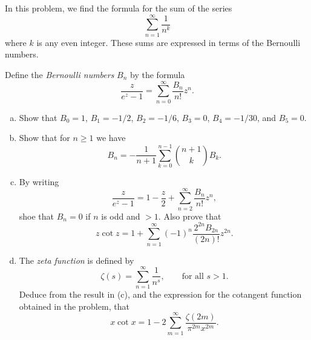 \begin{pb}[4]
    In this problem, we find the formula for the sum of the series
    \begin{equation*}
        \sum_{n = 1}^{\infty} \frac{1}{n^k}
    \end{equation*}
    where \(k\) is any even integer.
    These sums are expressed in terms of the Bernoulli numbers.

    Define the \emph{Bernoulli numbers} \(B_n\) by the formula
    \begin{equation*}
        \frac{z}{e^z - 1} = \sum_{n = 0}^{\infty} \frac{B_n}{n!} z^n.
    \end{equation*}
    \begin{enumerate}[(a)]
    \item
        Show that \(B_0 = 1\), \(B_1 = - 1 / 2\), \(B_2 = -1 / 6\),
        \(B_3 = 0\), \(B_4 = -1 / 30\), and \(B_5 = 0\).
    
    \item
        Show that for \(n \geq 1\) we have
        \begin{equation*}
            B_n = - \frac{1}{n + 1} \sum_{k = 0}^{n - 1}  \binom{n + 1}{k} B_k.
        \end{equation*}
    
    \item
        By writing
        \begin{equation*}
            \frac{z}{e^z - 1} = 1 - \frac{z}{2} + \sum_{n = 2}^{\infty} \frac{B_n}{n!}z^n,
        \end{equation*}
        shoe that \(B_n = 0\) if \(n\) is odd and \(> 1\).
        Also prove that
        \begin{equation*}
            z \cot z = 1 + \sum_{n = 1}^{\infty} (-1)^n \frac{2^{2n} B_{2n}}{(2n)!} z^{2n}.
        \end{equation*}
    
    \item
        The \emph{zeta function} is defined by
        \begin{equation*}
            \zeta(s) = \sum_{n = 1}^{\infty}  \frac{1}{n^s}, \quad \quad \text{for all \(s > 1\)}.
        \end{equation*}
        Deduce from the result in (c), and the expression for the cotangent function
        obtained in the problem, that
        \begin{equation*}
            x \cot x = 1 - 2 \sum_{m = 1}^{\infty} \frac{\zeta(2m)}{\pi^{2m}x^{2m}}.
        \end{equation*}
    

\end{enumerate}
\end{pb}
